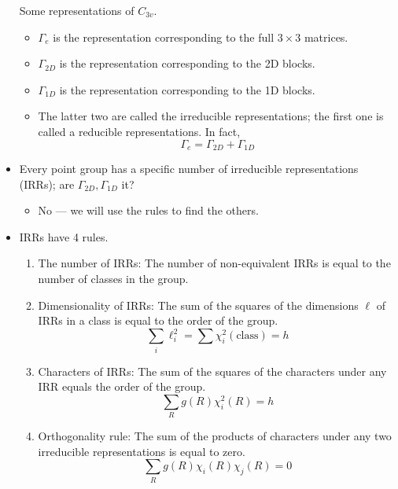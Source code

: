 \documentclass[../notes.tex]{subfiles}
\begin{document}
\begin{itemize}
\begin{table}[h!]
        \caption{Some representations of $C_{3v}$.}
        \label{tab:C3vReps}
    \end{table}
    \begin{itemize}
        \item $\Gamma_e$ is the representation corresponding to the full $3\times 3$ matrices.
        \item $\Gamma_{2D}$ is the representation corresponding to the 2D blocks.
        \item $\Gamma_{1D}$ is the representation corresponding to the 1D blocks.
        \item The latter two are called the irreducible representations; the first one is called a reducible representations. In fact,
        \begin{equation*}
            \Gamma_e = \Gamma_{2D}+\Gamma_{1D}
        \end{equation*}
    \end{itemize}
    \item Every point group has a specific number of irreducible representations (IRRs); are $\Gamma_{2D},\Gamma_{1D}$ it?
    \begin{itemize}
        \item No --- we will use the rules to find the others.
    \end{itemize}
    \item IRRs have 4 rules.
    \begin{enumerate}
        \item The number of IRRs: The number of non-equivalent IRRs is equal to the number of classes in the group.
        \item Dimensionality of IRRs: The sum of the squares of the dimensions $\ell$ of IRRs in a class is equal to the order of the group.
        \begin{equation*}
            \sum_i\ell_i^2 = \sum\chi_i^2(\text{class}) = h
        \end{equation*}
        \item Characters of IRRs: The sum of the squares of the characters under any IRR equals the order of the group.
        \begin{equation*}
            \sum_Rg(R)\chi_i^2(R) = h
        \end{equation*}
        \item Orthogonality rule: The sum of the products of characters under any two irreducible representations is equal to zero.
        \begin{equation*}
            \sum_Rg(R)\chi_i(R)\chi_j(R) = 0

\end{equation*}
\end{enumerate}
\end{itemize}
\end{document}
